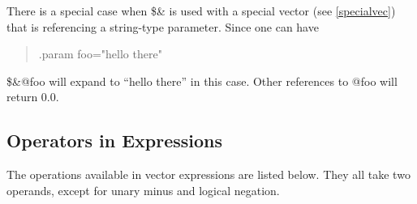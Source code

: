 There is a special case when {\vt \$\&} is used with a special vector
(see \ref{specialvec}) that is referencing a string-type parameter. 
Since one can have
\begin{quote}\vt
.param foo="hello there"
\end{quote}
{\vt \$\&@foo} will expand to ``{\vt hello there}'' in this case. 
Other references to {\vt @foo} will return 0.0.

\subsection{Operators in Expressions}


The operations available in vector expressions are listed below.  They
all take two operands, except for unary minus and logical negation. 

